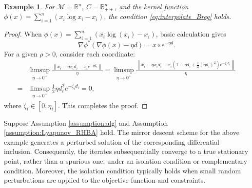 \documentclass[11pt]{article}
\newcommand{\R}{\mathbb R}
\newcommand{\cM}{\mathcal M}
\def\norm#1{\left\|#1\right\|}
\newtheorem{example}{Example}[section]
\begin{document}
\begin{example}
For $\cM=\R^n$, $C=\R^n_{++}$, and the kernel function $\phi(x) = \sum_{i=1}^n (x_i \log x_i - x_i)$, the condition \eqref{eq:interpolate_Breg} holds.
\end{example}
\begin{proof}
When $\phi(x)=\sum_{i=1}^n(x_i\log(x_i)-x_i)$, basic calculation gives
\[
\nabla\phi^*(\nabla\phi(x)-\eta d)=x\circ e^{-\eta d}.
\] 
For a given $\rho > 0$, consider each coordinate:
\[
\begin{aligned}
&\limsup_{\eta\to0^+}\frac{\norm{x_i-\eta x_i d_i-x_i e^{-\eta d_i}}}{\eta}=\limsup_{\eta\to0^+}\frac{\norm{x_i-\eta x_id_i-x_i(1-\eta d_i+\frac{1}{2}(\eta d_i)^2)e^{-\zeta_id_i}}}{\eta}\\
=&\limsup_{\eta\to0^+}\frac{1}{2}\eta d_i^2e^{-\zeta_id_i}=0,
\end{aligned}
\]
where $\zeta_i\in[0,\eta_i]$. This completes the proof.
\end{proof}


Suppose Assumption \ref{assumption:alg} and Assumption \ref{assumption:Lyapunov_RHBA} hold.  The mirror descent scheme for the above example generates a perturbed solution of the corresponding differential inclusion. Consequently, the iterates subsequentially converge to a true stationary point, rather than a spurious one, under an isolation condition or complementary condition. Moreover, the isolation condition typically holds when small random perturbations are applied to the objective function and constraints.
\end{document}
